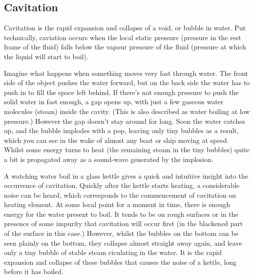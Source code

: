 \documentclass{article}\usepackage[]{graphicx}\usepackage[]{color}
\begin{document}
\subsection{Cavitation}
Cavitation is the rapid expansion and collapse of a void, or bubble in water. Put technically, caviation occurs when the local static pressure (pressure in the rest frame of the fluid) falls below the vapour pressure of the fluid (pressure at which the liquid will start to boil).

Imagine what happens when something moves very fast through water.  The front side of the object pushes the water forward, but on the back side the water has to push in to fill the space left behind.  If there’s not enough pressure to push the solid water in fast enough, a gap opens up, with just a few gaseous water molecules (steam) inside the cavity.  (This is also described as water boiling at low pressure.)  However the gap doesn’t stay around for long.  Soon the water catches up, and the bubble implodes with a pop, leaving only tiny bubbles as a result, which you can see in the wake of almost any boat or ship moving at speed.  Whilst some energy turns to heat (the remaining steam in the tiny bubbles) quite a bit is propagated away as a sound-wave generated by the implosion.

A watching water boil in a glass kettle gives a quick and intuitive insight into the occurrence of cavitation.  Quickly after the kettle starts heating, a considerable noise can be heard, which corresponds to the commencement of cavitation on heating element. At some local point for a moment in time, there is enough energy for the water present to boil.  It tends to be on rough surfaces or in the presence of some impurity that cavitation will occur first (in the blackened part of the surface in this case.)  However, whilst the bubbles on the bottom can be seen plainly on the bottom, they collapse almost straight away again, and leave only a tiny bubble of stable steam ciculating in the water.  It is the rapid expansion and collapse of these bubbles that causes the noise of a kettle, long before it has boiled.
\end{document}
